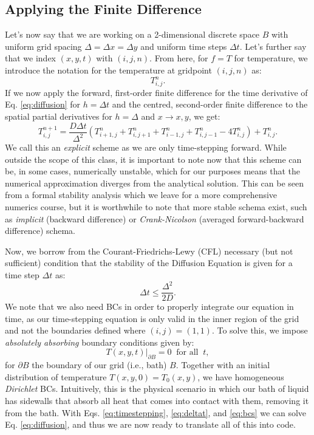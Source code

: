 \documentclass[11pt]{article}
\begin{document}
\subsection*{Applying the Finite Difference}

Let's now say that we are working on a 2-dimensional discrete space $B$ with uniform grid spacing $\Delta = \Delta x = \Delta y$ and uniform time steps $\Delta t$.
Let's further say that we index $\left(x,y,t\right)$ with $\left(i,j, n\right)$.
From here, for $f = T$ for temperature, we introduce the notation for the temperature at gridpoint $\left(i,j,n\right)$ as:
 \begin{equation}
	T_{i,j}^n.
\end{equation}
If we now apply the forward, first-order finite difference for the time derivative of Eq. \eqref{eq:diffusion} for $h = \Delta t$ and the centred, second-order finite difference to the spatial partial derivatives for $h = \Delta$ and $x \to  x, y$, we get:
\begin{equation}
	T_{i,j}^{n+1} = \frac{D \Delta t}{\Delta^2} \left(T_{i+1,j}^n + T_{i,j+1}^n + T_{i-1,j}^n + T_{i,j-1}^n - 4T_{i,j}^n\right) + T_{i,j}^n.
	\label{eq:timestepping}
\end{equation}
We call this an \emph{explicit} scheme as we are only time-stepping forward. 
While outside the scope of this class, it is important to note now that this scheme can be, in some cases, numerically unstable, which for our purposes means that the numerical approximation diverges from the analytical solution. 
This can be seen from a formal stability analysis which we leave for a more comprehensive numerics course, but it is worthwhile to note that more stable schema exist, such as \emph{implicit} (backward difference) or \emph{Crank-Nicolson} (averaged forward-backward difference) schema. \par
Now, we borrow from the Courant-Friedrichs-Lewy (CFL) necessary (but not sufficient) condition that the stability of the Diffusion Equation is given for a time step $\Delta t$ as:
\begin{equation}
	\Delta t \le \frac{\Delta ^2}{2D}.
	\label{eq:deltat}
\end{equation}
We note that we also need BCs in order to properly integrate our equation in time, as our time-stepping equation is only valid in the inner region of the grid and not the boundaries defined where $\left(i,j\right)=\left(1,1\right)$.
To solve this, we impose \emph{absolutely absorbing} boundary conditions given by:
\begin{equation}
	T\left(x,y,t\right)\big\lvert_{\partial B} = 0 \: \text{ for all } \: t,
	\label{eq:bcs}
\end{equation}
for $\partial B$ the boundary of our grid  (i.e., bath) $B$.
Together with an initial distribution of temperature $T\left(x,y,0\right) = T_0\left(x,y\right)$, we have homogeneous \emph{Dirichlet} BCs.
Intuitively, this is the physical scenario in which our bath of liquid has sidewalls that absorb all heat that comes into contact with them, removing it from the bath.
With Eqs. \eqref{eq:timestepping}, \eqref{eq:deltat}, and \eqref{eq:bcs} we can solve Eq. \eqref{eq:diffusion}, and thus we are now ready to translate all of this into code.

\end{document}
